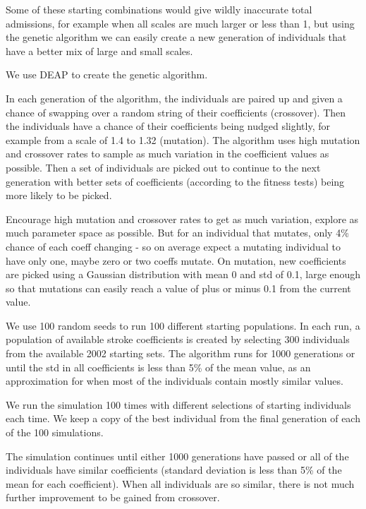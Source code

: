 \documentclass[12pt]{extarticle}
\begin{document}
Some of these starting combinations would give wildly inaccurate total admissions, for example when all scales are much larger or less than 1, but using the genetic algorithm we can easily create a new generation of individuals that have a better mix of large and small scales.




We use DEAP to create the genetic algorithm.


In each generation of the algorithm, the individuals are paired up and given a chance of swapping over a random string of their coefficients (crossover). Then the individuals have a chance of their coefficients being nudged slightly, for example from a scale of 1.4 to 1.32 (mutation). The algorithm uses high mutation and crossover rates to sample as much variation in the coefficient values as possible.
Then a set of individuals are picked out to continue to the next generation with better sets of coefficients (according to the fitness tests) being more likely to be picked.


Encourage high mutation and crossover rates to get as much variation, explore as much parameter space as possible.
But for an individual that mutates, only 4\% chance of each coeff changing - so on average expect a mutating individual to have only one, maybe zero or two coeffs mutate.
On mutation, new coefficients are picked using a Gaussian distribution with mean 0 and std of 0.1, large enough so that mutations can easily reach a value of plus or minus 0.1 from the current value.

We use 100 random seeds to run 100 different starting populations.
In each run, a population of available stroke coefficients is created by selecting 300 individuals from the available 2002 starting sets.
The algorithm runs for 1000 generations or until the std in all coefficients is less than 5\% of the mean value, as an approximation for when most of the individuals contain mostly similar values. 


We run the simulation 100 times with different selections of starting individuals each time. We keep a copy of the best individual from the final generation of each of the 100 simulations.

The simulation continues until either 1000 generations have passed or all of the individuals have similar coefficients (standard deviation is less than 5\% of the mean for each coefficient). When all individuals are so similar, there is not much further improvement to be gained from crossover.
\end{document}
